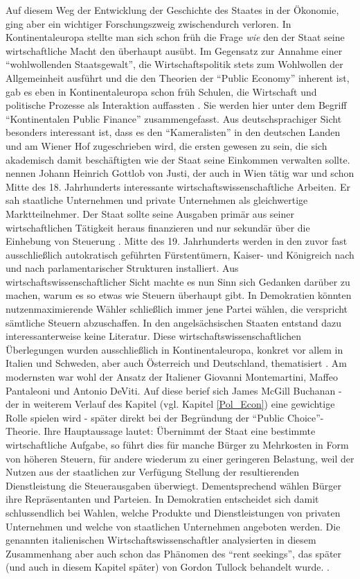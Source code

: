 Auf diesem Weg der Entwicklung der Geschichte des Staates in der Ökonomie, ging aber ein wichtiger Forschungszweig zwischendurch verloren. In Kontinentaleuropa stellte man sich schon früh die Frage \textit{wie} den der Staat seine wirtschaftliche Macht den überhaupt ausübt. Im Gegensatz zur Annahme einer "`wohlwollenden Staatsgewalt"', die Wirtschaftspolitik stets zum Wohlwollen der Allgemeinheit ausführt und die den Theorien der "`Public Economy"' inherent ist, gab es eben in Kontinentaleuropa schon früh Schulen, die Wirtschaft und politische Prozesse als Interaktion auffassten \parencite[S. 2]{Backhaus2005}. Sie werden hier unter dem Begriff "`Kontinentalen Public Finance"' zusammengefasst. Aus deutschsprachiger Sicht besonders interessant ist, dass es den "`Kameralisten"' in den deutschen Landen und am Wiener Hof zugeschrieben wird, die ersten gewesen zu sein, die sich akademisch damit beschäftigten wie der Staat seine Einkommen verwalten sollte. \textcite[S. 7]{Backhaus2005} nennen Johann Heinrich Gottlob von Justi, der auch in Wien tätig war und schon Mitte des 18. Jahrhunderts interessante wirtschaftswissenschaftliche Arbeiten. Er sah staatliche Unternehmen und private Unternehmen als gleichwertige Marktteilnehmer. Der Staat sollte seine Ausgaben primär aus seiner wirtschaftlichen Tätigkeit heraus finanzieren und nur sekundär über die Einhebung von Steuerung \parencite[S. 10]{Backhaus2005}. Mitte des 19. Jahrhunderts werden in den zuvor fast ausschließlich autokratisch geführten Fürstentümern, Kaiser- und Königreich nach und nach parlamentarischer Strukturen installiert. Aus wirtschaftswissenschaftlicher Sicht machte es nun Sinn sich Gedanken darüber zu machen, warum es so etwas wie Steuern überhaupt gibt. In Demokratien könnten nutzenmaximierende Wähler schließlich immer jene Partei wählen, die verspricht sämtliche Steuern abzuschaffen. In den angelsächsischen Staaten entstand dazu interessanterweise keine Literatur. Diese wirtschaftswissenschaftlichen Überlegungen wurden ausschließlich in Kontinentaleuropa, konkret vor allem in Italien und Schweden, aber auch Österreich und Deutschland, thematisiert \parencite[S. 12]{Backhaus2005}. Am modernsten war wohl der Ansatz der Italiener Giovanni Montemartini, Maffeo Pantaleoni und Antonio DeViti. Auf diese berief sich James McGill Buchanan - der in weiterem Verlauf des Kapitel (vgl. Kapitel \ref{Pol_Econ}) eine gewichtige Rolle spielen wird - später direkt bei der Begründung der "`Public Choice"'-Theorie. Ihre Hauptaussage lautet: Übernimmt der Staat eine bestimmte wirtschaftliche Aufgabe, so führt dies für manche Bürger zu Mehrkosten in Form von höheren Steuern, für andere wiederum zu einer geringeren Belastung, weil der Nutzen aus der staatlichen zur Verfügung Stellung der resultierenden Dienstleistung die Steuerausgaben überwiegt. Dementsprechend wählen Bürger ihre Repräsentanten und Parteien. In Demokratien entscheidet sich damit schlussendlich bei Wahlen, welche Produkte und Dienstleistungen von privaten Unternehmen und welche von staatlichen Unternehmen angeboten werden. Die genannten italienischen Wirtschaftswissenschaftler analysierten in diesem Zusammenhang aber auch schon das Phänomen des "`rent seekings"', das später (und auch in diesem Kapitel später) von Gordon Tullock behandelt wurde. \parencite[S. 16]{Backhaus2005}. 
	
